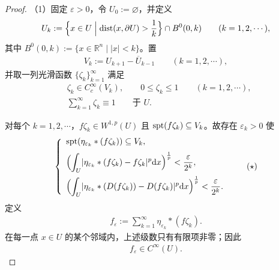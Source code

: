 \documentclass[../../main.tex]{subfiles}%
\begin{document}
\begin{proof}
（1）固定 $\varepsilon>0$，令 $U_0:=\varnothing$，并定义
\begin{align*}
U_k:=\Bigl\{x\in U\Bigm|\operatorname{dist}(x,\partial U)>\frac1k\Bigr\}\cap B^0(0,k)\qquad(k=1,2,\cdots),
\end{align*}
其中 $B^0(0,k):=\{x\in\mathbb{R}^n\mid\lvert x\rvert<k\}$。置
\begin{align*}
V_k:=U_{k+1}-\overline{U}_{k-1}\qquad(k=1,2,\cdots),
\end{align*}
并取一列光滑函数 $\{\zeta_k\}_{k=1}^{\infty}$ 满足
\begin{align*}
&\zeta_k\in C_c^\infty(V_k),\qquad0\leqslant\zeta_k\leqslant1\qquad(k=1,2,\cdots),\\
&\sum_{k=1}^{\infty}\zeta_k\equiv1\qquad\text{于 }U.
\end{align*}

对每个 $k=1,2,\cdots$，$f\zeta_k\in W^{1,p}(U)$ 且 $\operatorname{spt}(f\zeta_k)\subseteq V_k$。故存在 $\varepsilon_k>0$ 使
\begin{align*}
\left\{
\begin{array}{l}
\displaystyle\operatorname{spt}(\eta_{\varepsilon_k}*(f\zeta_k))\subseteq V_k,\\[6pt]
\displaystyle\Bigl(\int_U\lvert\eta_{\varepsilon_k}*(f\zeta_k)-f\zeta_k\rvert^p\mathrm{d} x\Bigr)^{\frac1p}<\frac{\varepsilon}{2^k},\\[10pt]
\displaystyle\Bigl(\int_U\lvert\eta_{\varepsilon_k}*(D(f\zeta_k))-D(f\zeta_k)\rvert^p\mathrm{d} x\Bigr)^{\frac1p}<\frac{\varepsilon}{2^k}.
\end{array}
\right.\qquad(\star)
\end{align*}
定义
\begin{align*}
f_\varepsilon:=\sum_{k=1}^{\infty}\eta_{\varepsilon_k}*(f\zeta_k).
\end{align*}
在每一点 $x\in U$ 的某个邻域内，上述级数只有有限项非零；因此
\begin{align*}
f_\varepsilon\in C^\infty(U).
\end{align*}


\end{proof}
\end{document}
